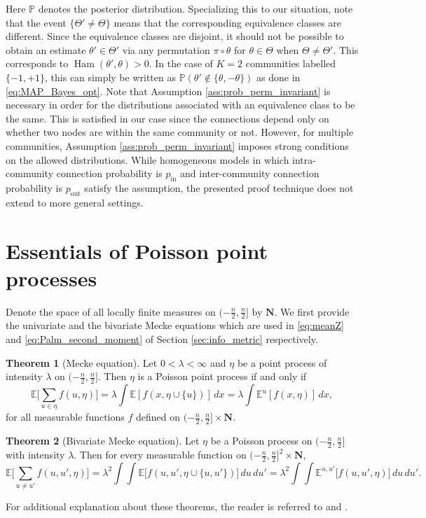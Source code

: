 \documentclass[letterpaper,11pt]{article}
\newtheorem{thm}{Theorem}[section]
\theoremstyle{definition}
\def\E{\mathbb{E}}
\def\P{\mathbb{P}}
\def\bN{\bm{N}}
\newcommand{\pin}{p_{\text{in}}}
\newcommand{\pout}{p_{\text{out}}}
\def\torus{(-\frac{n}{2}, \frac{n}{2}]}
\numberwithin{equation}{section}
\newcommand{\la}{\lambda}
\newcommand{\Ham}{\operatorname{Ham}}
\newtheorem{thm}{Theorem}[section]
\theoremstyle{definition}
\def\E{\mathbb{E}}
\def\P{\mathbb{P}}
\def\bN{\bm{N}}
\newcommand{\pin}{p_{\text{in}}}
\newcommand{\pout}{p_{\text{out}}}
\def\torus{(-\frac{n}{2}, \frac{n}{2}]}
\numberwithin{equation}{section}
\newcommand{\la}{\lambda}
\newcommand{\Ham}{\operatorname{Ham}}
\theoremstyle{thmstyletwo}%
\begin{document}
\begin{appendices}
\[\]
Here $\P$ denotes the posterior distribution.
Specializing this to our situation, note that the event $\{\Theta' \neq \Theta\}$ means that the corresponding equivalence classes are different. Since the equivalence classes are disjoint, it should not be possible to obtain an estimate $\theta' \in \Theta'$ via any permutation $\pi \circ \theta $ for $\theta \in \Theta$ when $\Theta \neq \Theta'$. This corresponds to $\Ham(\theta',\theta) > 0$. In the case of $K=2$ communities labelled $\{-1,+1\}$, this can simply be written as $\P(\theta' \not \in \{\theta,-\theta\})$ as done in \eqref{eq:MAP_Bayes_opt}. Note that Assumption \ref{ass:prob_perm_invariant} is necessary in order for the distributions associated with an equivalence class to be the same. This is satisfied in our case since the connections depend only on whether two nodes are within the same community or not. However, for multiple communities, Assumption \ref{ass:prob_perm_invariant} imposes strong conditions on the allowed distributions. While homogeneous models in which intra-community connection probability is $\pin$ and inter-community connection probability is $\pout$ satisfy the assumption, the presented proof technique does not extend to more general settings.

\section{Essentials of Poisson point processes}
\label{sec:ppp}

Denote the space of all locally finite measures on $\torus$ by $\bN$. We first provide the univariate and the bivariate Mecke equations which are used in \eqref{eq:meanZ} and \eqref{eq:Palm_second_moment} of Section \ref{sec:info_metric} respectively.
\begin{thm}[Mecke equation]
Let $0<\la<\infty$ and $\eta$ be a point process of intensity $\la$ on $\torus$. Then $\eta$ is a Poisson point process if and only if 
\[
\E\Big[\sum_{u\in \eta}f(u,\eta)\Big] = \la \int \E[f(x,\eta\cup \{u\})] \,dx= \la \int \E^{u}[f(x,\eta)] \, dx,
\]
for all measurable functions $f$ defined on $\torus \times \bN$.
\label{thm:uni_mecke}
\end{thm}
\begin{thm}[Bivariate Mecke equation]
Let $\eta$ be a Poisson process on $\torus$ with intensity $\la$. Then for every measurable function on $\torus^2 \times \bN$,
\[
\E\bigg[\sum_{u\neq u'}f(u,u',\eta)\bigg] = \la^2 \int \int  \E\Big[f(u,u',\eta\cup\{u,u'\}) \Big] \, du \, du'= \la^2 \int \int  \E^{u,u'}\Big[f(u,u',\eta) \Big]\, du \,du'.
\]
\label{thm:multi_mecke}
\end{thm}
For additional explanation about these theorems, the reader is referred to \cite[Chapter 9]{last2017lectures} and \cite[Chapter 6]{baccelli2020random}.
%
%
\end{appendices}
\end{document}
